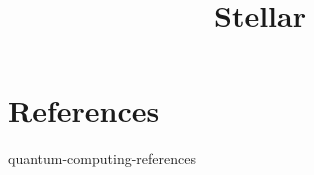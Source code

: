 \documentclass[preview]{standalone}
\begin{document}
\title{Stellar}
\genpage

\nocite{*} %

\section{References}

\begin{snippet}{quantum-computing-references}
\printbibliography[heading=none]
\end{snippet}
\end{document}
